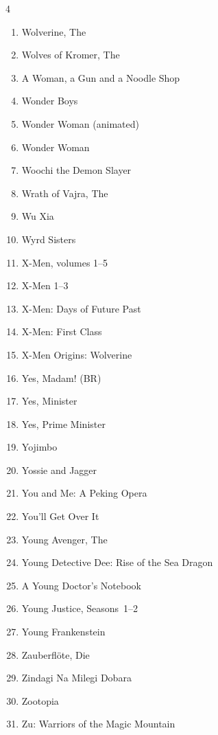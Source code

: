 \documentclass{article}
\begin{document}
\begin{multicols}{4}
\begin{enumerate}
\item Wolverine, The
\item Wolves of Kromer, The
\item A Woman, a Gun and a Noodle Shop
\item Wonder Boys
\item Wonder Woman (animated)
\item Wonder Woman
\item Woochi the Demon Slayer
\item Wrath of Vajra, The
\item Wu Xia
\item Wyrd Sisters
\item X-Men, volumes 1--5
\item X-Men 1--3
\item X-Men: Days of Future Past
\item X-Men: First Class
\item X-Men Origins: Wolverine
\item Yes, Madam! (BR)
\item Yes, Minister
\item Yes, Prime Minister
\item Yojimbo
\item Yossie and Jagger
\item You and Me: A Peking Opera
\item You'll Get Over It
\item Young Avenger, The
\item Young Detective Dee: Rise of the Sea Dragon
\item A Young Doctor's Notebook
\item Young Justice, Seasons~1--2
\item Young Frankenstein
\item Zauberfl\"ote, Die
\item Zindagi Na Milegi Dobara
\item Zootopia
\item Zu: Warriors of the Magic Mountain

\end{enumerate}

\end{multicols}
\end{document}
